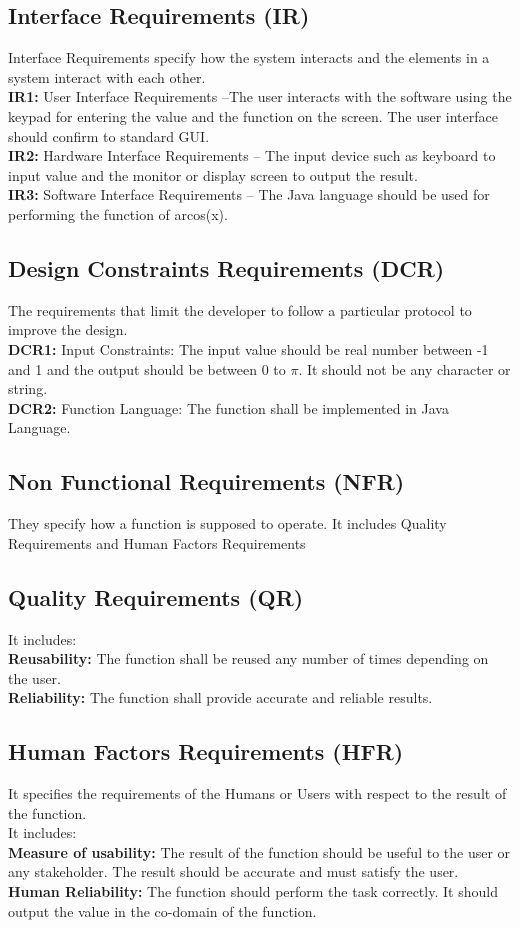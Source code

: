 \documentclass[12pt]{report}
\begin{document}
\subsection*{Interface Requirements (IR)}Interface Requirements specify how the system interacts and the elements in a system interact with each other.\\
\textbf{IR1: }User Interface Requirements –The user interacts with the software using the keypad for entering the value and the function on the screen. The user interface should confirm to standard GUI.\\
\textbf{IR2: }Hardware Interface Requirements – The input device such as keyboard to input value and the monitor or display screen to output the result.\\
\textbf{IR3: }Software Interface Requirements – The Java language should be used for performing the function of arcos(x).

\subsection*{Design Constraints Requirements (DCR)}The requirements that limit the developer to follow a particular protocol to improve the design.\\
\textbf{DCR1: }Input Constraints: The input value should be real number between -1 and 1 and the output should be between 0 to $\pi$. It should not be any character or string.\\
\textbf{DCR2: }Function Language: The function shall be implemented in Java Language.
\subsection*{Non Functional Requirements (NFR)}They specify how a function is supposed to operate. It includes Quality Requirements and Human Factors Requirements
\subsection*{Quality Requirements (QR)}It includes:\\
\textbf{Reusability: }The function shall be reused any number of times depending on the user.\\
\textbf{Reliability: }The function shall provide accurate and reliable results.
\subsection*{Human Factors Requirements (HFR)}It specifies the requirements of the Humans or Users with respect to the result of the function.\\ It includes:\\
\textbf{Measure of usability: }The result of the function should be useful to the user or any stakeholder. The result should be accurate and must satisfy the user.\\
\textbf{Human Reliability: }The function should perform the task correctly. It should output the value in the co-domain of the function.
\end{document}

